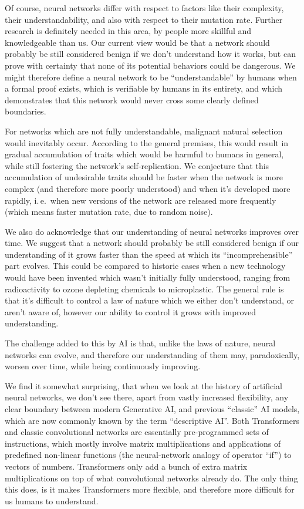 \documentclass[12pt]{article}
\begin{document}
Of course, neural networks differ with respect to factors like their complexity, their
understandability, and also with respect to their mutation rate. Further research is
definitely needed in this area, by people more skillful and knowledgeable than us. Our
current view would be that a network should probably be still considered benign if we
don't understand how it works, but can prove with certainty that none of its potential
behaviors could be dangerous. We might therefore define a neural network to be
``understandable'' by humans when a formal proof exists, which is verifiable by humans in
its entirety, and which demonstrates that this network would never cross some clearly
defined boundaries.

For networks which are not fully understandable, malignant natural selection would
inevitably occur. According to the general premises, this would result in gradual
accumulation of traits which would be harmful to humans in general, while still fostering
the network's self-replication. We conjecture that this accumulation of undesirable
traits should be faster when the network is more complex (and therefore more poorly
understood) and when it's developed more rapidly, i.\,e.\ when new versions of the
network are released more frequently (which means faster mutation rate, due to random
noise).

We also do acknowledge that our understanding of neural networks improves over time. We
suggest that a network should probably be still considered benign if our understanding of
it grows faster than the speed at which its ``incomprehensible'' part evolves. This could
be compared to historic cases when a new technology would have been invented which wasn't
initially fully understood, ranging from radioactivity to ozone depleting chemicals to
microplastic. The general rule is that it's difficult to control a law of nature which
we either don't understand, or aren't aware of, however our ability to control it grows
with improved understanding.

The challenge added to this by AI is that, unlike the laws of nature, neural networks can
evolve, and therefore our understanding of them may, paradoxically, worsen over time,
while being continuously improving.

We find it somewhat surprising, that when we look at the history of artificial neural
networks, we don't see there, apart from vastly increased flexibility, any clear boundary
between modern Generative AI, and previous ``classic'' AI models, which are now commonly
known by the term ``descriptive AI''. Both Transformers and classic convolutional
networks are essentially pre-programmed sets of instructions, which mostly involve matrix
multiplications and applications of predefined non-linear functions (the neural-network
analogy of operator ``if'') to vectors of numbers. Transformers only add a bunch of extra
matrix multiplications on top of what convolutional networks already do. The only thing
this does, is it makes Transformers more flexible, and therefore more difficult for us
humans to understand.
\end{document}
